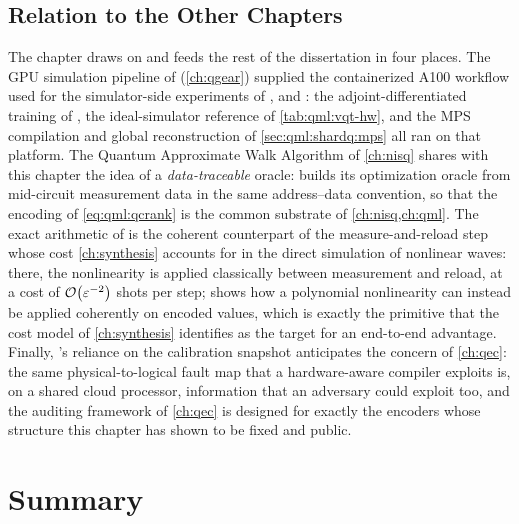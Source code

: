 \subsection{Relation to the Other Chapters}\label{sec:qml:synthesis:bridges}

The chapter draws on and feeds the rest of the dissertation in four places. The GPU simulation pipeline of \qgear{} (\cref{ch:qgear}) supplied the containerized A100 workflow used for the simulator-side experiments of \qpie{}, \vqt{} and \shardq{}: the adjoint-differentiated training of \qpie{}, the ideal-simulator reference of \cref{tab:qml:vqt-hw}, and the MPS compilation and global reconstruction of \cref{sec:qml:shardq:mps} all ran on that platform. The Quantum Approximate Walk Algorithm of \cref{ch:nisq} shares with this chapter the idea of a \emph{data-traceable} oracle: \qawa{} builds its optimization oracle from mid-circuit measurement data in the same address--data convention, so that the encoding of \cref{eq:qml:qcrank} is the common substrate of \cref{ch:nisq,ch:qml}. The exact arithmetic of \nnqa{} is the coherent counterpart of the measure-and-reload step whose cost \cref{ch:synthesis} accounts for in the direct simulation of nonlinear waves: there, the nonlinearity is applied classically between measurement and reload, at a cost of $\mathcal{O}\!\left(\varepsilon^{-2}\right)$ shots per step; \nnqa{} shows how a polynomial nonlinearity can instead be applied coherently on encoded values, which is exactly the primitive that the cost model of \cref{ch:synthesis} identifies as the target for an end-to-end advantage. Finally, \shardq{}'s reliance on the calibration snapshot anticipates the concern of \cref{ch:qec}: the same physical-to-logical fault map that a hardware-aware compiler exploits is, on a shared cloud processor, information that an adversary could exploit too, and the auditing framework of \cref{ch:qec} is designed for exactly the encoders whose structure this chapter has shown to be fixed and public.

\section{Summary}\label{sec:qml:summary}

